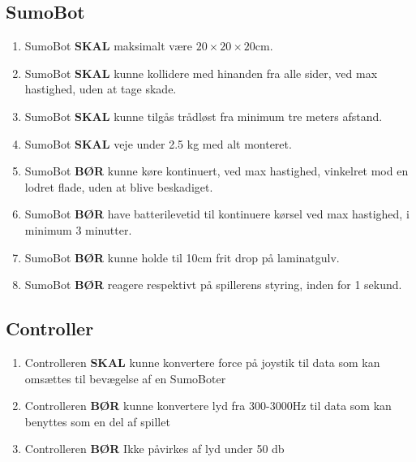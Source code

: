 \subsection{SumoBot}
\begin{enumerate}
    \item SumoBot \textbf{SKAL} maksimalt være $20 \times 20 \times 20$cm.
    \item SumoBot \textbf{SKAL} kunne kollidere med hinanden fra alle sider, ved max hastighed, uden at tage skade.
    \item SumoBot \textbf{SKAL} kunne tilgås trådløst fra minimum tre meters afstand.
    \item SumoBot \textbf{SKAL} veje under 2.5 kg med alt monteret.
    \item SumoBot \textbf {BØR} kunne køre kontinuert, ved max hastighed, vinkelret mod en lodret flade, uden at blive beskadiget.
    \item SumoBot \textbf{BØR} have batterilevetid til kontinuere kørsel ved max hastighed, i minimum 3 minutter.
    \item SumoBot \textbf{BØR} kunne holde til 10cm frit drop på laminatgulv.
    \item SumoBot \textbf{BØR} reagere respektivt på spillerens styring, inden for 1 sekund.
\end{enumerate}

\subsection{Controller}
\begin{enumerate}
    \item Controlleren \textbf{SKAL} kunne konvertere force på joystik til data som kan omsættes til bevægelse af en SumoBoter
    \item Controlleren \textbf{BØR} kunne konvertere lyd fra 300-3000Hz til data som kan benyttes som en del af spillet
    \item Controlleren \textbf{BØR} Ikke påvirkes af lyd under 50 db
    
\end{enumerate}
